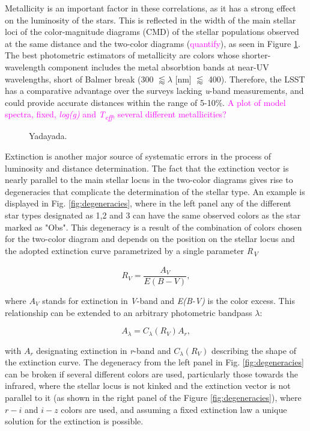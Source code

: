 \documentclass[linenumbers, twocolumn, trackchanges]{aastex631}
\newcommand{\magcom}[1]{\textcolor{magenta}{#1}} %
\begin{document}
Metallicity is an important factor in these correlations, as it has a strong effect on the luminosity of the stars. This is reflected in the width of the main stellar loci of the color-magnitude diagrams (CMD) of the stellar populations observed at the same distance and the two-color diagrams (\magcom{quantify}), as seen in Figure \ref{fig:metallicity}. The best photometric estimators of metallicity are colors whose shorter-wavelength component includes the metal absorbtion bands at near-UV wavelengths, short of Balmer break (300 $\lessapprox\lambda$ [nm] $\lessapprox$ 400). Therefore, the LSST has a comparative advantage over the surveys lacking \textit{u}-band measurements, and could provide accurate distances within the range of 5-10\%. \magcom{A plot of model spectra, fixed, \textit{log(g)} and \textit{T\textsubscript{eff}}, several different metallicities?}

\begin{figure}[ht!]
	\caption{Yadayada. \label{fig:metallicity}}
\end{figure}

Extinction is another major source of systematic errors in the process of luminosity and distance determination. The fact that the extinction vector is nearly parallel to the main stellar locus in the two-color diagrams gives rise to degeneracies that complicate the determination of the stellar type. An example is displayed in Fig. \ref{fig:degeneracies}, where in the left panel any of the different star types designated as 1,2 and 3 can have the same observed colors as the star marked as "Obs". This degeneracy is a result of the combination of colors chosen for the two-color diagram and depends on the position on the stellar locus and the adopted extinction curve parametrized by a single parameter \textit{R\textsubscript{V}}

\begin{equation}
	R_V = \frac{A_V}{E(B-V)},
\end{equation}

where $A_V$ stands for extinction in \textit{V}-band and \textit{E(B-V)} is the color excess. This relationship can be extended to an arbitrary photometric bandpass $\lambda$:

\begin{equation}
	A_{\lambda} = C_{\lambda}(R_V)A_r,
\end{equation}

with $A_r$ designating extinction in \textit{r}-band and $C_{\lambda}(R_V)$ describing the shape of the extinction curve. The degeneracy from the left panel in Fig. \ref{fig:degeneracies} can be broken if several different colors are used, particularly those towards the infrared, where the stellar locus is not kinked and the extinction vector is not parallel to it (as shown in the right panel of the Figure \ref{fig:degeneracies}), where $r-i$ and $i-z$ colors are used, and assuming a fixed extinction law a unique solution for the extinction is possible. 
\end{document}
